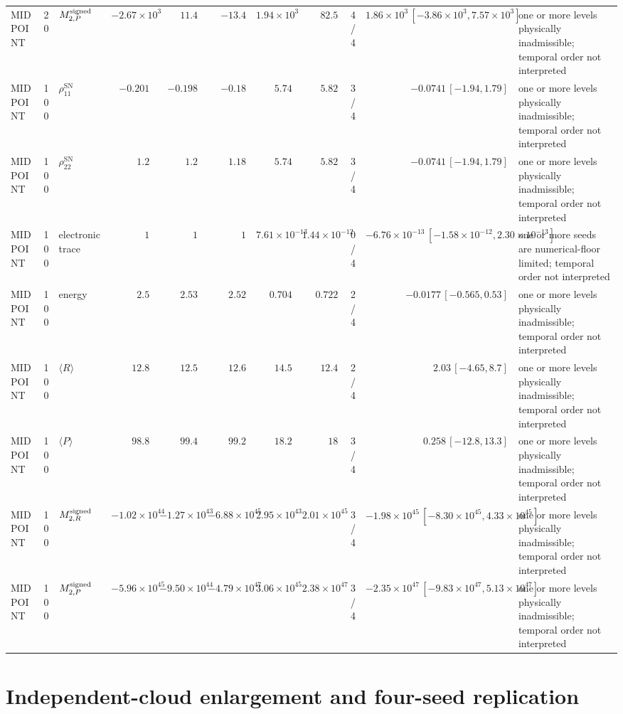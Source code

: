 \begin{landscape}
\begin{longtable}{l r l r r r r r r r L{0.15\textwidth}}
MIDPOINT & 20 & $M^{\rm signed}_{2,P}$ & $-2.67\times10^{3}$ & $11.4$ & $-13.4$ & $1.94\times10^{3}$ & $82.5$ & 4/4 & $1.86\times10^{3}\,[-3.86\times10^{3},7.57\times10^{3}]$ & one or more levels physically inadmissible; temporal order not interpreted \\
MIDPOINT & 100 & $\rho_{11}^{\mathrm{SN}}$ & $-0.201$ & $-0.198$ & $-0.18$ & $5.74$ & $5.82$ & 3/4 & $-0.0741\,[-1.94,1.79]$ & one or more levels physically inadmissible; temporal order not interpreted \\
MIDPOINT & 100 & $\rho_{22}^{\mathrm{SN}}$ & $1.2$ & $1.2$ & $1.18$ & $5.74$ & $5.82$ & 3/4 & $-0.0741\,[-1.94,1.79]$ & one or more levels physically inadmissible; temporal order not interpreted \\
MIDPOINT & 100 & electronic trace & $1$ & $1$ & $1$ & $7.61\times10^{-13}$ & $1.44\times10^{-12}$ & 0/4 & $-6.76\times10^{-13}\,[-1.58\times10^{-12},2.30\times10^{-13}]$ & one or more seeds are numerical-floor limited; temporal order not interpreted \\
MIDPOINT & 100 & energy & $2.5$ & $2.53$ & $2.52$ & $0.704$ & $0.722$ & 2/4 & $-0.0177\,[-0.565,0.53]$ & one or more levels physically inadmissible; temporal order not interpreted \\
MIDPOINT & 100 & $\langle R\rangle$ & $12.8$ & $12.5$ & $12.6$ & $14.5$ & $12.4$ & 2/4 & $2.03\,[-4.65,8.7]$ & one or more levels physically inadmissible; temporal order not interpreted \\
MIDPOINT & 100 & $\langle P\rangle$ & $98.8$ & $99.4$ & $99.2$ & $18.2$ & $18$ & 3/4 & $0.258\,[-12.8,13.3]$ & one or more levels physically inadmissible; temporal order not interpreted \\
MIDPOINT & 100 & $M^{\rm signed}_{2,R}$ & $-1.02\times10^{44}$ & $-1.27\times10^{43}$ & $-6.88\times10^{45}$ & $2.95\times10^{43}$ & $2.01\times10^{45}$ & 3/4 & $-1.98\times10^{45}\,[-8.30\times10^{45},4.33\times10^{45}]$ & one or more levels physically inadmissible; temporal order not interpreted \\
MIDPOINT & 100 & $M^{\rm signed}_{2,P}$ & $-5.96\times10^{45}$ & $-9.50\times10^{44}$ & $-4.79\times10^{47}$ & $3.06\times10^{45}$ & $2.38\times10^{47}$ & 3/4 & $-2.35\times10^{47}\,[-9.83\times10^{47},5.13\times10^{47}]$ & one or more levels physically inadmissible; temporal order not interpreted \\
\end{longtable}
\endgroup
\end{landscape}

\section{Independent-cloud enlargement and four-seed replication}
\label{sec:results-support-replication}

